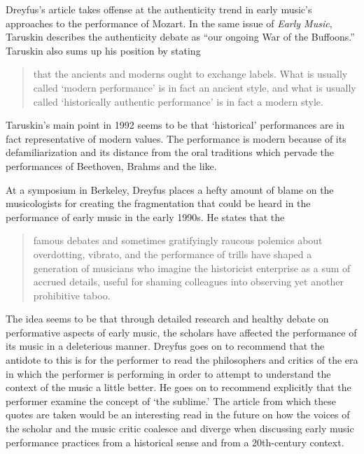 \documentclass[12pt]{article}
\begin{document}
Dreyfus's article takes offense at the authenticity trend in early
music's approaches to the performance of Mozart.\autocite{dreyfus1992}
In the same issue of \emph{Early Music}, Taruskin describes the
authenticity debate as ``our ongoing War of the
Buffoons.''\autocite[311]{taruskin1992} Taruskin also sums up his
position by stating
\begin{quote}
  that the ancients and moderns ought to exchange labels. What is
  usually called `modern performance' is in fact an ancient style, and
  what is usually called `historically authentic performance' is in
  fact a modern style.\autocite[311]{taruskin1992}
\end{quote}
Taruskin's main point in 1992 seems to be that `historical'
performances are in fact representative of modern values. The
performance is modern because of its defamiliarization and its
distance from the oral traditions which pervade the performances of
Beethoven, Brahms and the like.\autocite[314]{taruskin1992}

At a symposium in Berkeley, Dreyfus places a hefty amount of blame on
the musicologists for creating the fragmentation that could be heard
in the performance of early music in the early 1990s. He states that
the
\begin{quote}
  famous debates and sometimes gratifyingly raucous polemics about
  overdotting, vibrato, and the performance of trills have shaped a
  generation of musicians who imagine the historicist enterprise as a
  sum of accrued details, useful for shaming colleagues into observing
  yet another prohibitive taboo.\autocite[116]{kerman1992}
\end{quote}
The idea seems to be that through detailed research and healthy debate
on performative aspects of early music, the scholars have affected the
performance of its music in a deleterious manner. Dreyfus goes on to
recommend that the antidote to this is for the performer to read the
philosophers and critics of the era in which the performer is
performing in order to attempt to understand the context of the music
a little better. He goes on to recommend explicitly that the performer
examine the concept of `the sublime.'\autocite[116]{kerman1992} The
article from which these quotes are taken would be an interesting read
in the future on how the voices of the scholar and the music critic
coalesce and diverge when discussing early music performance practices
from a historical sense and from a 20th-century context.
\end{document}
